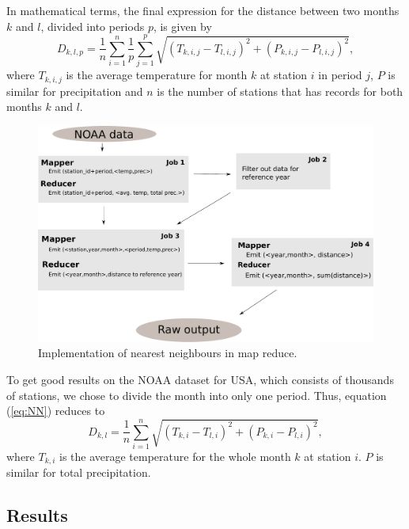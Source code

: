 In mathematical terms, the final expression for the distance between two months
$k$ and $l$, divided into periods $p$, is given by
\begin{equation}
	\label{eq:NN}
	D_{k,l,p} = \frac{1}{n}\sum_{i=1}^{n}{\frac{1}{p}\sum_{j=1}^{p}{
		\sqrt{
			(T_{k,i,j} - T_{l,i,j})^2 + 
			(P_{k,i,j} - P_{l,i,j})^2
		}}},
\end{equation}
where $T_{k,i,j}$ is the average temperature for month $k$ at station $i$ in 
period $j$, $P$ is similar for precipitation and $n$ is the number of stations
that has records for both months $k$ and $l$.

\begin{figure}[tb]
 	\begin{center}
 		\includegraphics[width=12cm]{figures/NNmapReduce.pdf}
 	\end{center}
 	\caption{Implementation of nearest neighbours in map reduce.}
 	\label{fig:NNmapReduce}
 \end{figure} 

To get good results on the NOAA dataset for USA, which consists of thousands 
of stations, we chose to divide the month into only one period. Thus, equation
(\ref{eq:NN}) reduces to
\begin{equation}
	\label{eq:NN_usa}
	D_{k,l} = \frac{1}{n}\sum_{i=1}^{n}{
	\sqrt{
		(T_{k,i} - T_{l,i})^2 + 
		(P_{k,i} - P_{l,i})^2
	}},
\end{equation}
where $T_{k,i}$ is the average temperature for the whole month $k$ at station $
i$. $P$ is similar for total precipitation. 


\subsection{Results} %

